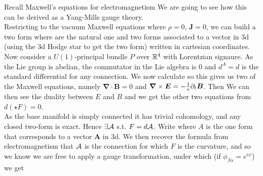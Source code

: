 \documentclass{article}
\begin{document}
Recall Maxwell's equations for electromagnetism 
We are going to see how this can be derived as a Yang-Mills gauge theory. \\
Restricting to the vacuum Maxwell equations where $\rho = 0, \, \bm{J} = 0$, we can build a two form 
where 
are the natural one and two forms associated to a vector in 3d (using the 3d Hodge star to get the two form) written in cartesian coordinates. Now consider a $U(1)$-principal bundle $P$ over $\mathbb{R}^4$ with Lorentzian signaure. As the Lie group is abelian, the commutator in the Lie algebra is 0 and $d^A = d$ is the standard differential for any connection. We now calculate
so this gives us two of the Maxwell equations, namely $\bm{\nabla} \cdot \bm{B}= 0$ and $\bm{\nabla}\times \bm{E} = -\frac{1}{c} \partial_t \bm{B}$. Then
We can then see the duality between $E$ and $B$ and we get the other two equations from $d(\star F)=0$. \\
As the base manifold is simply connected it has trivial cohomology, and any closed two-form is exact. Hence $\exists \mathcal{A}$ s.t. $F = d\mathcal{A}$. Write 
where $A$ is the one form that corresponds to a vector $\bm{A}$ in 3d. We then recover the formula from electromagnetism that 
$\mathcal{A}$ is the connection for which $F$ is the curvature, and so we know we are free to apply a gauge transformation, under which (if $\phi_{\beta\alpha}=e^{i\psi}$) we get 
\end{document}
